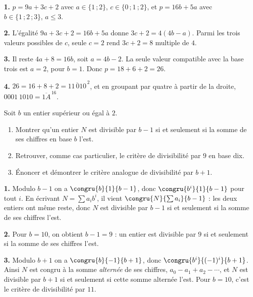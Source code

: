 \begin{corrige}
\textbf{1.} $p = 9a+3c+2$ avec $a \in \{1\,;2\}$, $c \in \{0\,;1\,;2\}$, et
$p = 16b+5a$ avec $b \in \{1\,;2\,;3\}$, $a \leq 3$.

\textbf{2.} L'égalité $9a+3c+2 = 16b+5a$ donne $3c+2 = 4(4b-a)$. Parmi les
trois valeurs possibles de $c$, seule $c = 2$ rend $3c+2 = 8$ multiple de
$4$.

\textbf{3.} Il reste $4a+8 = 16b$, soit $a = 4b-2$. La seule valeur compatible
avec la base trois est $a = 2$, pour $b = 1$. Donc
$p = 18+6+2 = 26$.

\textbf{4.} $26 = 16+8+2 = \overline{11\,010}^{\,2}$, et en groupant par
quatre à partir de la droite, $0001\ 1010 = \overline{1A}^{\,16}$.
\end{corrige}

\begin{concours}
Soit $b$ un entier supérieur ou égal à $2$.

\begin{enumerate}[label=\textbf{\arabic*.}, leftmargin=*, itemsep=0.25em]
  \item Montrer qu'un entier $N$ est divisible par $b-1$ si et seulement si la
        somme de ses chiffres en base $b$ l'est.
  \item Retrouver, comme cas particulier, le critère de divisibilité par $9$
        en base dix.
  \item Énoncer et démontrer le critère analogue de divisibilité par $b+1$.
\end{enumerate}
\end{concours}

\begin{corrige}
\textbf{1.} Modulo $b-1$ on a $\congru{b}{1}{b-1}$, donc
$\congru{b^{i}}{1}{b-1}$ pour tout $i$. En écrivant
$N = \sum a_{i}b^{i}$, il vient $\congru{N}{\sum a_{i}}{b-1}$ : les deux
entiers ont même reste, donc $N$ est divisible par $b-1$ si et seulement si la
somme de ses chiffres l'est.

\textbf{2.} Pour $b = 10$, on obtient $b-1 = 9$ : un entier est divisible par
$9$ si et seulement si la somme de ses chiffres l'est.

\textbf{3.} Modulo $b+1$ on a $\congru{b}{-1}{b+1}$, donc
$\congru{b^{i}}{(-1)^{i}}{b+1}$. Ainsi $N$ est congru à la somme
\emph{alternée} de ses chiffres, $a_{0}-a_{1}+a_{2}-\cdots$, et $N$ est
divisible par $b+1$ si et seulement si cette somme alternée l'est. Pour
$b = 10$, c'est le critère de divisibilité par $11$.
\end{corrige}

